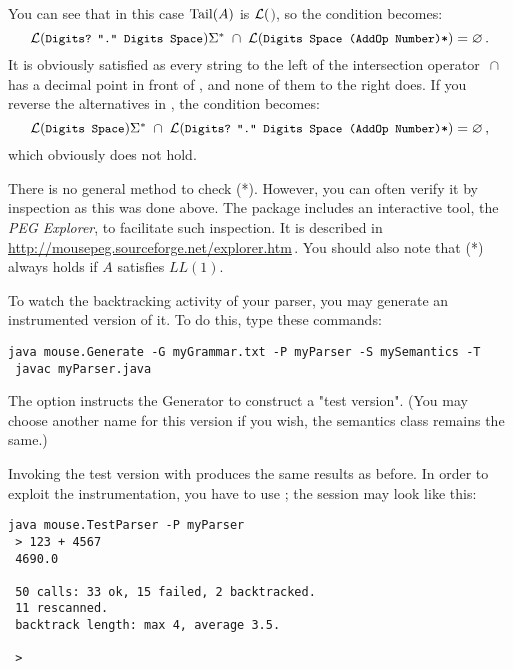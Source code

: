 You can see that in this case $\operatorname{Tail}(A)$ is 
$\mathcal{L}($$)$, so the condition becomes:
%
\begin{equation*}
\sL($\stx{Digits?\;\,"." Digits Space}$)\Sigma^*\; \cap \;\sL($\stx{Digits Space (AddOp Number)*}$) = \emptyset\,.
\end{equation*}
%
It is obviously satisfied as every string to the left of the intersection operator  $\,\cap\,$
has a decimal point in front of \Digits,
and none of them to the right does.
If you reverse the alternatives in \Number,
the condition becomes:
%
\begin{equation*}
\sL($\stx{Digits Space}$)\Sigma^*\; \cap\; \sL($\stx{Digits?\;\,"." Digits Space (AddOp Number)*}$) = \emptyset\,,
\end{equation*}
%
which obviously does not hold.

There is no general method to check (*). 
However, 
you can often verify it by inspection as this was done above.
The \Mouse\/ package includes an interactive tool, the \textsl{PEG Explorer},
to facilitate such inspection.
It is described in \url{http://mousepeg.sourceforge.net/explorer.htm}\,.\newline 
You should also note that (*) always holds if $A$ satisfies $LL(1)$.

To watch the backtracking activity of your parser,
you may generate an instrumented version of it.
To do this, type these commands:

\small
\begin{Verbatim}[samepage=true,xleftmargin=15mm,baselinestretch=0.8]
 java mouse.Generate -G myGrammar.txt -P myParser -S mySemantics -T
 javac myParser.java
\end{Verbatim}
\normalsize

The option  instructs the Generator to construct a "test version".
(You may choose another name for this version if you wish,
the semantics class remains the same.)

\newpage
Invoking the test version with 
produces the same results as before.
In order to exploit the instrumentation, you have to use ;
the session may look like this:

\small
\begin{Verbatim}[samepage=true,xleftmargin=15mm,baselinestretch=0.8]
 java mouse.TestParser -P myParser
 > 123 + 4567
 4690.0

 50 calls: 33 ok, 15 failed, 2 backtracked.
 11 rescanned.
 backtrack length: max 4, average 3.5.

 >
\end{Verbatim}
\normalsize

